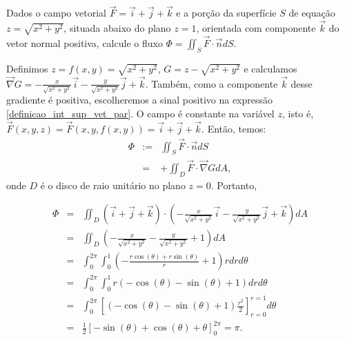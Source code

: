 \begin{exeresol} Dados o campo vetorial $\vec{F}=\vec{i}+\vec{j}+\vec{k}$ e a porção da superfície $S$ de equação $z=\sqrt{x^2+y^2}$, situada abaixo do plano $z=1$, orientada com componente $\vec{k}$ do vetor normal positiva, calcule o fluxo $\Phi=\iint_{S} \vec{F}\cdot \vec{n}dS$.
\end{exeresol}
\begin{resol}
Definimos $z=f(x,y)=\sqrt{x^2+y^2}$, $G=z-\sqrt{x^2+y^2}$ e calculamos $\vec{\nabla}G=-\frac{x}{\sqrt{x^2+y^2}}\vec{i}-\frac{y}{\sqrt{x^2+y^2}}\vec{j}+\vec{k}$. Também, como a componente $\vec{k}$ desse gradiente é positiva, escolheremos a sinal positivo na expressão \eqref{definicao_int_sup_vet_par}. O campo é constante na variável $z$, isto é, $\vec{F}(x,y,z)=\vec{F}(x,y,f(x,y))=\vec{i}+\vec{j}+\vec{k}$. Então, temos:
\begin{eqnarray*}
\Phi&:=&\iint_{S} \vec{F}\cdot \vec{n}dS\\
&=&+\iint_D \vec{F}\cdot \vec{\nabla} G dA,
\end{eqnarray*}
onde $D$ é o disco de raio unitário no plano $z=0$. Portanto,
\end{resol}
\begin{eqnarray*}
\Phi&=&\iint_D (\vec{i}+\vec{j}+\vec{k})\cdot \left(-\frac{x}{\sqrt{x^2+y^2}}\vec{i}-\frac{y}{\sqrt{x^2+y^2}}\vec{j}+\vec{k}\right) dA\\
&=&\iint_D \left(-\frac{x}{\sqrt{x^2+y^2}}-\frac{y}{\sqrt{x^2+y^2}}+1\right) dA\\
&=&\int_0^{2\pi}\int_0^1 \left(-\frac{r\cos(\theta)+r\sin(\theta)}{r}+1\right) rdrd\theta\\
&=&\int_0^{2\pi}\int_0^1 r\left(-\cos(\theta)-\sin(\theta)+1\right) drd\theta\\
&=&\int_0^{2\pi}\left[\left(-\cos(\theta)-\sin(\theta)+1\right)\frac{r^2}{2}\right]_{r=0}^{r=1} d\theta\\
&=&\frac{1}{2}\left[-\sin(\theta)+\cos(\theta)+\theta\right]_0^{2\pi}=\pi.
\end{eqnarray*}




